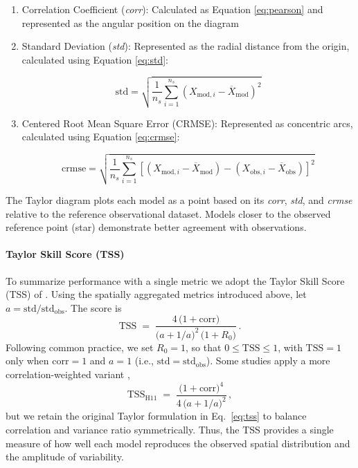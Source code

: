 \documentclass[pdflatex,sn-chicago]{sn-jnl}%
\theoremstyle{thmstyleone}%
\theoremstyle{thmstyletwo}%
\theoremstyle{thmstylethree}%
\begin{document}
\begin{enumerate}
    \item Correlation Coefficient (\textit{corr}): Calculated as Equation \ref{eq:pearson} and represented as the angular position on the diagram

    \item Standard Deviation (\textit{std}): Represented as the radial distance from the origin, calculated using Equation \ref{eq:std}:
    
    \begin{equation}
    \label{eq:std}
    \text{std} = \sqrt{\frac{1}{n_s} \sum\limits_{i=1}^{n_s} (X_{\text{mod},i} - \overline{X}_{\text{mod}})^2}
    \end{equation}

    \item Centered Root Mean Square Error (CRMSE): Represented as concentric arcs, calculated using Equation \ref{eq:crmse}:
    
    \begin{equation}
    \label{eq:crmse}
    \text{crmse} = \sqrt{\frac{1}{n_s} \sum\limits_{i=1}^{n_s} \left[(X_{\text{mod},i} - \overline{X}_{\text{mod}}) - (X_{\text{obs},i} - \overline{X}_{\text{obs}})\right]^2}
    \end{equation}
\end{enumerate}

The Taylor diagram plots each model as a point based on its \textit{corr}, \textit{std}, and \textit{crmse} relative to the reference observational dataset. Models closer to the observed reference point (star) demonstrate better agreement with observations.

\vspace{1em}

\paragraph{\textbf{Taylor Skill Score (TSS)}} 
To summarize performance with a single metric we adopt the Taylor Skill Score (TSS) of \citet{Taylor2001}. Using the spatially aggregated metrics introduced above, let \(a=\text{std}/\text{std}_{\text{obs}}\). The score is
\begin{equation}
\label{eq:tss}
\mathrm{TSS} \;=\; 
\frac{4\,\bigl(1+\text{corr}\bigr)}
{\bigl(a+1/a\bigr)^{2}\,\bigl(1+R_{0}\bigr)} \, .
\end{equation}
Following common practice, we set \(R_{0}=1\), so that \(0 \le \mathrm{TSS} \le 1\), with \(\mathrm{TSS}=1\) only when \(\text{corr}=1\) and \(a=1\) (i.e., \(\text{std}=\text{std}_{\text{obs}}\)). Some studies apply a more correlation-weighted variant \citep[e.g.,][]{Hirota2011},
\[
\mathrm{TSS}_{\mathrm{H11}} \;=\; 
\frac{\bigl(1+\text{corr}\bigr)^{4}}{4\,\bigl(a+1/a\bigr)^{2}} \, ,
\]
but we retain the original Taylor formulation in Eq.~\eqref{eq:tss} to balance correlation and variance ratio symmetrically. Thus, the TSS provides a single measure of how well each model reproduces the observed spatial distribution and the amplitude of variability.
\end{document}
